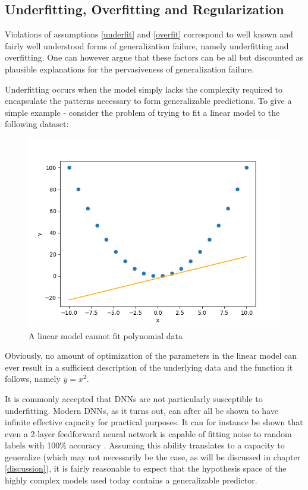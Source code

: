 	\subsection{Underfitting, Overfitting and Regularization}
		Violations of assumptions \ref{underfit} and \ref{overfit} correspond to well known and fairly well understood forms of generalization failure, namely underfitting and overfitting. One can however argue that these factors can be all but discounted as plausible explanations for the pervasiveness of generalization failure. 
		
		Underfitting occurs when the model simply lacks the complexity required to encapsulate the patterns necessary to form generalizable predictions. To give a simple example - consider the problem of trying to fit a linear model to the following dataset: 
		\begin{figure}[H]
			\includegraphics[width=\linewidth]{illustrations/regression_example.png}
			\caption{A linear model cannot fit polynomial data}
			\label{underfit example}
		\end{figure}
		Obviously, no amount of optimization of the parameters in the linear model can ever result in a sufficient description of the underlying data and the function it follows, namely \(y=x^2\). 
		
		It is commonly accepted that DNNs are not particularly susceptible to underfitting. Modern DNNs, as it turns out, can after all be shown to have infinite effective capacity for practical purposes. It can for instance be shown that even a 2-layer feedforward neural network is capable of fitting noise to random labels with 100\% accuracy \cite{randomlabels}. Assuming this ability translates to a capacity to generalize (which may not necessarily be the case, as will be discussed in chapter \ref{discussion}), it is fairly reasonable to expect that the hypothesis space of the highly complex models used today contains a generalizable predictor. 

